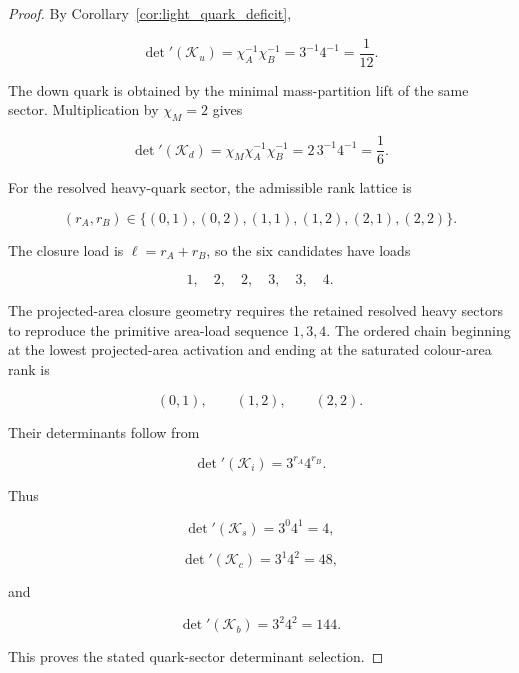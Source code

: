 \documentclass[11pt]{article}
\theoremstyle{definition}
\theoremstyle{remark}
\begin{document}
\begin{proof}

By Corollary~\ref{cor:light_quark_deficit},

\begin{equation}
\det{}'(\mathcal K_u)
=
\chi_A^{-1}\chi_B^{-1}
=
3^{-1}4^{-1}
=
\frac{1}{12}.
\end{equation}

The down quark is obtained by the minimal mass-partition lift of
the same sector. Multiplication by \(\chi_M=2\) gives

\begin{equation}
\det{}'(\mathcal K_d)
=
\chi_M\chi_A^{-1}\chi_B^{-1}
=
2\,3^{-1}4^{-1}
=
\frac{1}{6}.
\end{equation}

For the resolved heavy-quark sector, the admissible rank lattice is

\begin{equation}
(r_A,r_B)
\in
\{
(0,1),
(0,2),
(1,1),
(1,2),
(2,1),
(2,2)
\}.
\end{equation}

The closure load is \(\ell=r_A+r_B\), so the six candidates have
loads

\begin{equation}
1,
\quad
2,
\quad
2,
\quad
3,
\quad
3,
\quad
4.
\end{equation}

The projected-area closure geometry requires the retained
resolved heavy sectors to reproduce the primitive area-load
sequence \(1,3,4\). The ordered chain beginning at the lowest
projected-area activation and ending at the saturated
colour-area rank is

\begin{equation}
(0,1),
\qquad
(1,2),
\qquad
(2,2).
\end{equation}

Their determinants follow from

\begin{equation}
\det{}'(\mathcal K_i)
=
3^{r_A}4^{r_B}.
\end{equation}

Thus

\begin{equation}
\det{}'(\mathcal K_s)=3^0 4^1=4,
\end{equation}

\begin{equation}
\det{}'(\mathcal K_c)=3^1 4^2=48,
\end{equation}

and

\begin{equation}
\det{}'(\mathcal K_b)=3^2 4^2=144.
\end{equation}

This proves the stated quark-sector determinant selection.

\end{proof}
\end{document}

